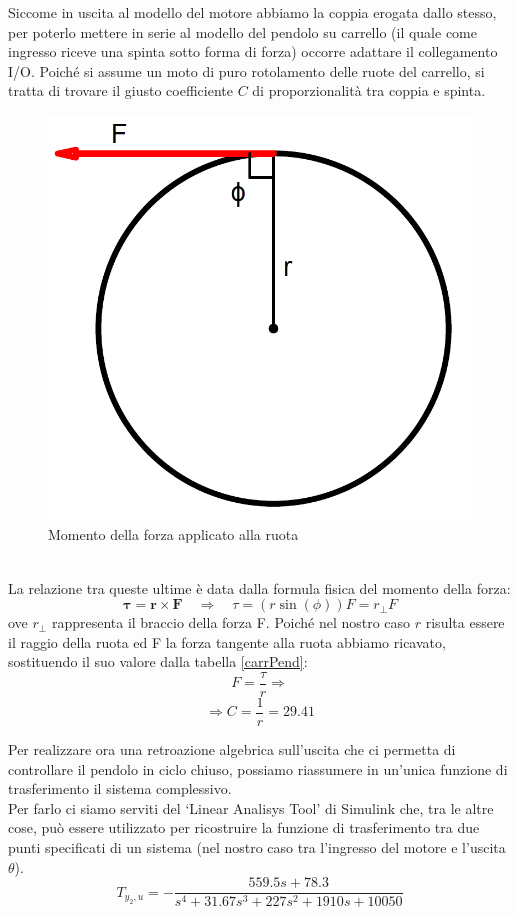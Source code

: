 Siccome in uscita al modello del motore abbiamo la coppia erogata dallo stesso, per poterlo mettere in serie al modello del pendolo su carrello (il quale come ingresso riceve una spinta sotto forma di forza) occorre adattare il collegamento I/O. Poiché si assume un moto di puro rotolamento delle ruote del carrello, si tratta di trovare il giusto coefficiente $C$ di proporzionalità tra coppia e spinta.
\begin{figure}[ht]
	\centering
	\includegraphics[scale=0.4]{braccioForza.PNG}
	\caption{Momento della forza applicato alla ruota}
	\label{braccioForza}
\end{figure}
\\La relazione tra queste ultime è data dalla formula fisica del momento della forza:
$$\boldsymbol{\tau}=\boldsymbol{r}\times \boldsymbol{F}\quad \Rightarrow\quad\tau=(r\sin(\phi))F=r_{\bot}F$$
ove $r_{\bot}$ rappresenta il braccio della forza F.
Poiché nel nostro caso $r$ risulta essere il raggio della ruota ed F la forza tangente alla ruota abbiamo ricavato, sostituendo il suo valore dalla tabella \ref{carrPend}: $$F=\displaystyle\frac{\tau}{r}\Rightarrow$$$$\Rightarrow C=\displaystyle\frac{1}{r}=29.41$$

Per realizzare ora una retroazione algebrica sull'uscita che ci permetta di controllare il pendolo in ciclo chiuso, possiamo riassumere in un'unica funzione di trasferimento il sistema complessivo.\\
Per farlo ci siamo serviti del `Linear Analisys Tool' di Simulink che, tra le altre cose, può essere utilizzato per ricostruire la funzione di trasferimento tra due punti specificati di un sistema (nel nostro caso tra l'ingresso del motore e l'uscita $\theta$).
$$T_{y_2,u}=-\displaystyle\frac{559.5s+78.3}{s^4+31.67s^3+227s^2+1910s+10050}$$

